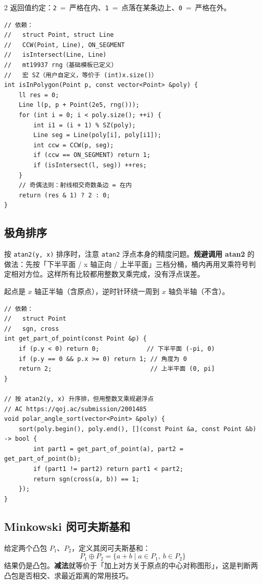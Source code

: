 \begin{multicols*}{2}
		返回值约定：\texttt{2}~=~严格在内、\texttt{1}~=~点落在某条边上、\texttt{0}~=~严格在外。

		\begin{verbatim}
// 依赖：
//   struct Point, struct Line
//   CCW(Point, Line), ON_SEGMENT
//   isIntersect(Line, Line)
//   mt19937 rng（基础模板已定义）
//   宏 SZ（用户自定义，等价于 (int)x.size()）
int isInPolygon(Point p, const vector<Point> &poly) {
	ll res = 0;
	Line l(p, p + Point(2e5, rng()));
	for (int i = 0; i < poly.size(); ++i) {
		int i1 = (i + 1) % SZ(poly);
		Line seg = Line(poly[i], poly[i1]);
		int ccw = CCW(p, seg);
		if (ccw == ON_SEGMENT) return 1;
		if (isIntersect(l, seg)) ++res;
	}
	// 奇偶法则：射线相交奇数条边 = 在内
	return (res & 1) ? 2 : 0;
}
		\end{verbatim}

		\subsection{极角排序}

		按 \texttt{atan2(y, x)} 排序时，注意 \texttt{atan2} 浮点本身的精度问题。\textbf{规避调用 atan2} 的做法：先按「下半平面 / x 轴正向 / 上半平面」三档分桶，桶内再用叉乘符号判定相对方位。这样所有比较都用整数叉乘完成，没有浮点误差。

		起点是 $x$ 轴正半轴（含原点），逆时针环绕一周到 $x$ 轴负半轴（不含）。

		\begin{verbatim}
// 依赖：
//   struct Point
//   sgn, cross
int get_part_of_point(const Point &p) {
	if (p.y < 0) return 0;             // 下半平面 (-pi, 0)
	if (p.y == 0 && p.x >= 0) return 1; // 角度为 0
	return 2;                           // 上半平面 (0, pi]
}

// 按 atan2(y, x) 升序排，但用整数叉乘规避浮点
// AC https://qoj.ac/submission/2001485
void polar_angle_sort(vector<Point> &poly) {
	sort(poly.begin(), poly.end(), [](const Point &a, const Point &b) -> bool {
		int part1 = get_part_of_point(a), part2 = get_part_of_point(b);
		if (part1 != part2) return part1 < part2;
		return sgn(cross(a, b)) == 1;
	});
}
		\end{verbatim}

		\subsection{Minkowski 闵可夫斯基和}

		给定两个凸包 $P_1$、$P_2$，定义其闵可夫斯基和：
		$$
		P_1 \oplus P_2 = \{a + b \mid a \in P_1,\ b \in P_2\}
		$$
		结果仍是凸包。\textbf{减法}就等价于「加上对方关于原点的中心对称图形」，这是判断两凸包是否相交、求最近距离的常用技巧。


\end{multicols*}

